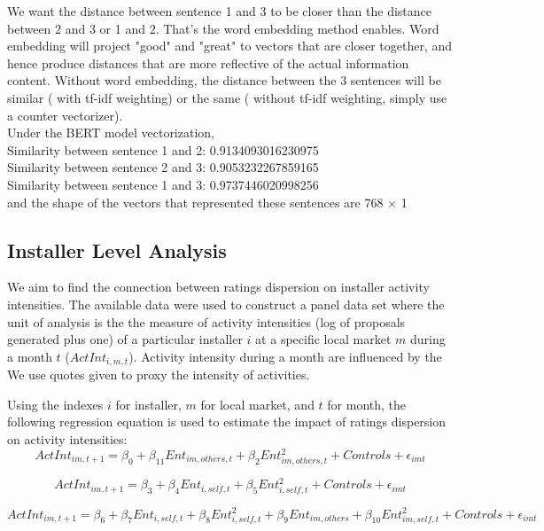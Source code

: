 \documentclass[msom,blindrev]{informs3}
\begin{document}
We want the distance between sentence 1 and 3 to be closer than the distance between 2 and 3 or 1 and 2. That's the word embedding method enables. Word embedding will project "good" and "great" to vectors that are closer together, and hence produce distances that are more reflective of the actual information content. Without word embedding, the distance between the 3 sentences will be similar ( with tf-idf weighting) or the same ( without tf-idf weighting, simply use a counter vectorizer). \\
Under the BERT model vectorization, \\
Similarity between sentence 1 and 2: 0.9134093016230975\\
Similarity between sentence 2 and 3: 0.9053232267859165\\
Similarity between sentence 1 and 3: 0.9737446020998256\\ 
and the shape of the vectors that represented these sentences are 768 $\times$ 1 \\ 


\subsection{Installer Level Analysis}
We aim to find the connection between ratings dispersion on installer activity intensities. The available data were used to construct a panel data set where the unit of analysis is the the measure of activity intensities (log of proposals generated plus one) of a particular installer $i$ at a specific local market $m$ during a month $t$ ($ActInt_{i,m,t}$). Activity intensity during a month are influenced by the  
We use quotes given to proxy the intensity of activities. 

Using the indexes $i$ for installer, $m$ for local market, and $t$ for month, the following regression equation is used to estimate the impact of ratings dispersion on activity intensities: 
\begin{equation}
    ActInt_{im,t+1}=\beta_{0}+\beta_{11} Ent_{im,others,t}+\beta_{2}Ent_{im,others,t}^2+  
   Controls+\epsilon_{imt} 
   \label{model_ind_1}
\end{equation}

\begin{equation}
    ActInt_{im,t+1}=\beta_{3}+\beta_{4} Ent_{i,self,t}+\beta_{5}Ent_{i,self,t}^2+  
   Controls+\epsilon_{imt} 
   \label{model_ind_2}
\end{equation}

\begin{equation}
    ActInt_{im,t+1}=\beta_{6}+\beta_{7} Ent_{i,self,t}+\beta_{8}Ent_{i,self,t}^2+\beta_{9}Ent_{im,others}+\beta_{10}Ent_{im,self,t}^2+  
   Controls+\epsilon_{imt} 
   \label{model_ind_3}
\end{equation}
\end{document}
